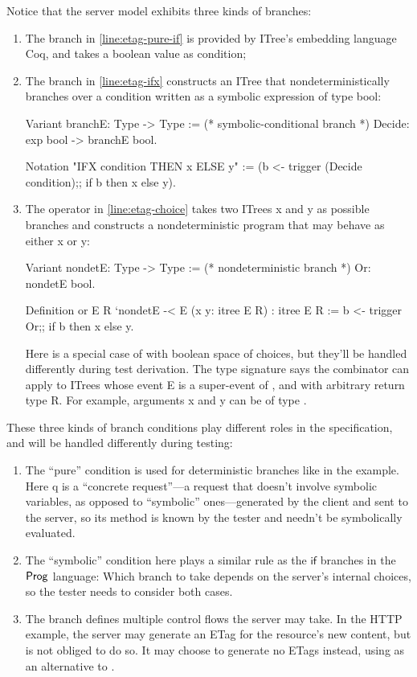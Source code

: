 Notice that the server model exhibits three kinds of branches:
\begin{enumerate}
\item The  branch in \autoref{line:etag-pure-if} is provided by ITree's
embedding language Coq, and takes a boolean value as condition;
\item The  branch in \autoref{line:etag-ifx} constructs an ITree that
nondeterministically branches over a condition written as a symbolic expression
of type bool:
\begin{coq}
  Variant branchE: Type -> Type := (* symbolic-conditional branch *)
    Decide: exp bool -> branchE bool.

  Notation "IFX condition THEN x ELSE y" :=
    (b <- trigger (Decide condition);;
     if b then x else y).
\end{coq}
\item The  operator in \autoref{line:etag-choice} takes two ITrees
\ilc x and \ilc y as possible branches and constructs a nondeterministic program
that may behave as either \ilc x or \ilc y:
\begin{coq}
  Variant nondetE: Type -> Type := (* nondeterministic branch *)
    Or: nondetE bool.

  Definition or {E R} `{nondetE -< E} (x y: itree E R) : itree E R :=
    b <- trigger Or;;
    if b then x else y.
\end{coq}
Here  is a special case of  with boolean space of
choices, but they'll be handled differently during test derivation.  The type
signature  says the  combinator can
apply to ITrees whose event \ilc E is a super-event of , and with
arbitrary return type \ilc R.  For example, arguments \ilc x and \ilc y can be
of type .
\end{enumerate}

These three kinds of branch conditions play different roles in the
specification, and will be handled differently during testing:
\begin{enumerate}
\item The ``pure''  condition is used for deterministic branches like
   in the example.  Here \ilc q is a ``concrete
  request''---a request that doesn't involve symbolic variables, as opposed to
  ``symbolic'' ones---generated by the client and sent to the server, so its
  method is known by the tester and needn't be symbolically evaluated.
\item The ``symbolic''  condition here plays a similar rule as the
  $\mathsf{if}$ branches in the $\mathsf{Prog}$ language: Which branch to take depends
  on the server's internal choices, so the tester needs to consider both cases.
\item The  branch defines multiple control flows the server may take.
  In the HTTP example, the server may generate an ETag for the resource's new
  content, but is not obliged to do so.  It may choose to generate no ETags
  instead, using  as an alternative
  to .
\end{enumerate}

